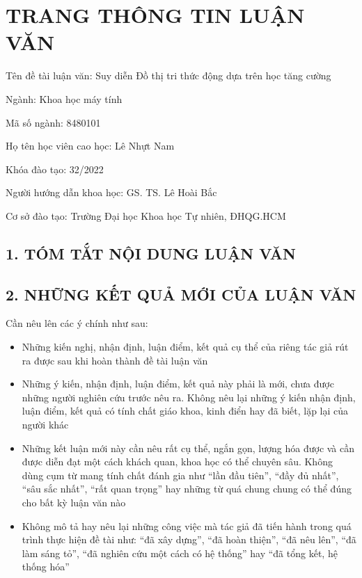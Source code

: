 \chapter*{TRANG THÔNG TIN LUẬN VĂN}

\begin{flushleft}
Tên đề tài luận văn: Suy diễn Đồ thị tri thức động dựa trên học tăng cường

Ngành: Khoa học máy tính

Mã số ngành: 8480101

Họ tên học viên cao học: Lê Nhựt Nam

Khóa đào tạo: 32/2022

Người hướng dẫn khoa học: GS. TS. Lê Hoài Bắc

Cơ sở đào tạo: Trường Đại học Khoa học Tự nhiên, ĐHQG.HCM 
\end{flushleft}

\section*{1. TÓM TẮT NỘI DUNG LUẬN VĂN}
\lipsum[1-2]

\section*{2. NHỮNG KẾT QUẢ MỚI CỦA LUẬN VĂN}

Cần nêu lên các ý chính như sau:
\begin{itemize}
    \item Những kiến nghị, nhận định, luận điểm, kết quả cụ thể của riêng tác giả rút ra được sau khi hoàn thành đề tài luận văn
    \item Những ý kiến, nhận định, luận điểm, kết quả này phải là mới, chưa được những người nghiên cứu trước nêu ra. Không nêu lại những ý kiến nhận định, luận điểm, kết quả có tính chất giáo khoa, kinh điển hay đã biết, lặp lại của người khác
    \item Những kết luận mới này cần nêu rất cụ thể, ngắn gọn, lượng hóa được và cần được diễn đạt một cách khách quan, khoa học có thể chuyên sâu. Không dùng cụm từ mang tính chất đánh gia như “lần đầu tiên”, “đầy đủ nhất”, “sâu sắc nhất”, “rất quan trọng” hay những từ quá chung chung có thể đúng cho bất kỳ luận văn nào
    \item Không mô tả hay nêu lại những công việc mà tác giả đã tiến hành trong quá trình thực hiện đề tài như: “đã xây dựng”, “đã hoàn thiện”, “đã nêu lên”, “đã làm sáng tỏ”, “đã nghiên cứu một cách có hệ thống” hay “đã tổng kết, hệ thống hóa”
\end{itemize}

